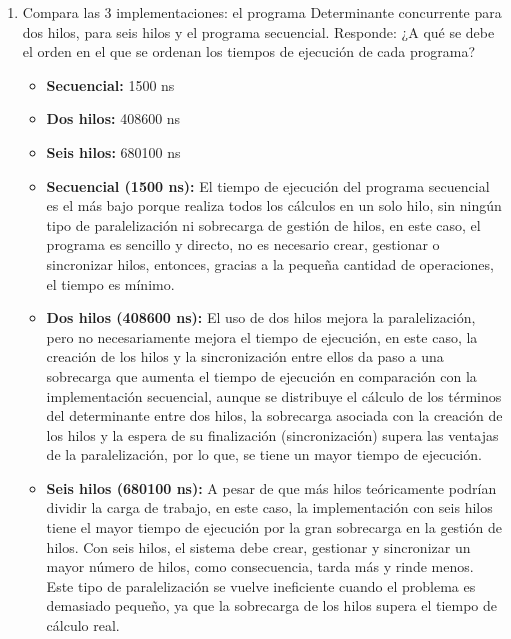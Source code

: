 \begin{enumerate}
    \hfill

    \item Compara las 3 implementaciones: el programa Determinante concurrente para dos hilos, para seis hilos y el programa secuencial. Responde: ¿A qué se debe el orden en el que se ordenan los tiempos de ejecución de cada programa?

    \begin{itemize}
        \item \textbf{Secuencial:} 1500 ns
        \item \textbf{Dos hilos:} 408600 ns
        \item \textbf{Seis hilos:} 680100 ns
    \end{itemize}

    \begin{itemize}
        \item \textbf{Secuencial (1500 ns):} El tiempo de ejecución del programa secuencial es el más bajo porque realiza todos los cálculos en un solo hilo, sin            ningún tipo de paralelización ni sobrecarga de gestión de hilos, en este caso, el programa es sencillo y directo, no es necesario crear, gestionar o                sincronizar hilos, entonces, gracias a la pequeña cantidad de operaciones, el tiempo es mínimo.
    
        \item \textbf{Dos hilos (408600 ns):} El uso de dos hilos mejora la paralelización, pero no necesariamente mejora el tiempo de ejecución, en este caso, la           creación de los hilos y la sincronización entre ellos da paso a una sobrecarga que aumenta el tiempo de ejecución en comparación con la implementación              secuencial, aunque se distribuye el cálculo de los términos del determinante entre dos hilos, la sobrecarga asociada con la creación de los hilos y la              espera de su finalización (sincronización) supera las ventajas de la paralelización, por lo que, se tiene un mayor tiempo de ejecución.
    
        \item \textbf{Seis hilos (680100 ns):} A pesar de que más hilos teóricamente podrían dividir la carga de trabajo, en este caso, la implementación con seis           hilos tiene el mayor tiempo de ejecución por la gran sobrecarga en la gestión de hilos. Con seis hilos, el sistema debe crear, gestionar y sincronizar un           mayor número de hilos, como consecuencia, tarda más y rinde menos. Este tipo de paralelización se vuelve ineficiente cuando el problema es demasiado                pequeño, ya que la sobrecarga de los hilos supera el tiempo de cálculo real.
\end{itemize}


\end{enumerate}
